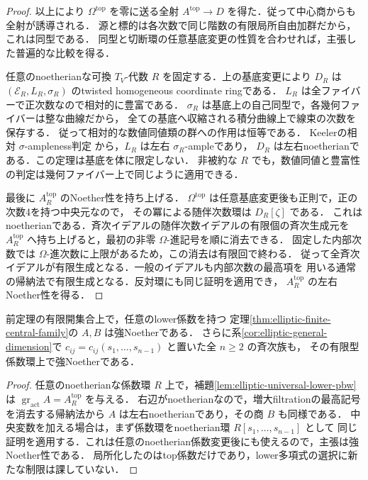 \begin{proof}
以上により $\Omega^{\mathrm{top}}$ を零に送る全射
$A^{\mathrm{top}}\to D$ を得た．従って中心商からも全射が誘導される．
源と標的は各次数で同じ階数の有限局所自由加群だから，これは同型である．
同型と切断環の任意基底変更の性質を合わせれば，主張した普遍的な比較を得る．

任意のnoetherianな可換 $T_V$-代数 $R$ を固定する．上の基底変更により
$D_R$ は $(\mathcal E_R,L_R,\sigma_R)$ のtwisted homogeneous coordinate ringである．
$L_R$ は全ファイバーで正次数なので相対的に豊富である．
$\sigma_R$ は基底上の自己同型で，各幾何ファイバーは整な曲線だから，
全ての基底へ収縮される積分曲線上で線束の次数を保存する．
従って相対的な数値同値類の群への作用は恒等である．
Keelerの相対 $\sigma$-ampleness判定
\cite[Theorems 7.13--7.14]{Keeler2003}から，$L_R$ は左右 $\sigma_R$-ampleであり，
$D_R$ は左右noetherianである．この定理は基底を体に限定しない．
非被約な $R$ でも，数値同値と豊富性の判定は幾何ファイバー上で同じように適用できる．

最後に $A_R^{\mathrm{top}}$ のNoether性を持ち上げる．
$\Omega^{\mathrm{top}}$ は任意基底変更後も正則で，正の次数4を持つ中央元なので，
その冪による随伴次数環は $D_R[\zeta]$ である．
これはnoetherianである．斉次イデアルの随伴次数イデアルの有限個の斉次生成元を
$A_R^{\mathrm{top}}$ へ持ち上げると，最初の非零 $\Omega$-進記号を順に消去できる．
固定した内部次数では $\Omega$-進次数に上限があるため，この消去は有限回で終わる．
従って全斉次イデアルが有限生成となる．一般のイデアルも内部次数の最高項を
用いる通常の帰納法で有限生成となる．反対環にも同じ証明を適用でき，
$A_R^{\mathrm{top}}$ の左右Noether性を得る．
\end{proof}

\begin{corollary}[任意lower項と全次元での強Noether性]
\label{cor:elliptic-strong-noetherian}
前定理の有限開集合上で，任意のlower係数を持つ
定理\ref{thm:elliptic-finite-central-family}の $A,B$ は強Noetherである．
さらに系\ref{cor:elliptic-general-dimension}で
$c_{ij}=c_{ij}(s_1,\ldots,s_{n-1})$ と置いた全 $n\ge2$ の斉次族も，
その有限型係数環上で強Noetherである．
\end{corollary}
\begin{proof}
任意のnoetherianな係数環 $R$ 上で，補題\ref{lem:elliptic-universal-lower-pbw}は
$\operatorname{gr}_{\mathrm{act}}A=A^{\mathrm{top}}_R$ を与える．
右辺がnoetherianなので，増大filtrationの最高記号を消去する帰納法から
$A$ は左右noetherianであり，その商 $B$ も同様である．
中央変数を加える場合は，まず係数環をnoetherian環 $R[s_1,\ldots,s_{n-1}]$ として
同じ証明を適用する．これは任意のnoetherian係数変更後にも使えるので，主張は強Noether性である．
局所化したのはtop係数だけであり，lower多項式の選択に新たな制限は課していない．
\end{proof}

